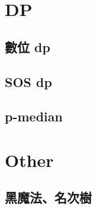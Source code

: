 \documentclass[a4paper,10pt,twocolumn,oneside]{article}
\begin{document}
\section{DP}
\subsection{數位 dp}

\subsection{SOS dp}

\subsection{p-median}

\section{Other}
\subsection{黑魔法、名次樹}

%
\end{document}
